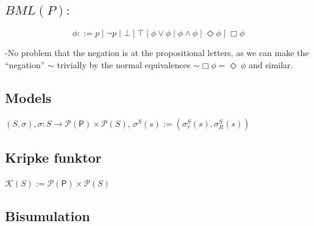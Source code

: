 \setcounter{secnumdepth}{-1} 

\newcommand{\num}[1]{\begin{align} #1 \end{align}}
\newcommand{\de}[1]{\stackrel{#1}{=}} 
\newcommand{\impl}[0]{\rightarrow}

\newcommand{\n}{\mathbb{N}}
\newcommand{\s}{\mathbb{S}} 
\newcommand{\bsa}{\underline{\leftrightarrow}}
\newcommand{\mea}{\leftrightsquigarrow}
\newcommand{\el}{\exists}
\newcommand{\ab}{\forall}
\newcommand{\pair}[1][x,y]{ (#1)}
\newcommand*\from{\colon}
\renewcommand{\P}{\mathcal{P}}
\newcommand{\K}{\mathcal{K}}
\newcommand{\PROP}{\mathsf{P}}
\newcommand{\Plift}{\overline \P}
\newcommand{\Klift}{\overline \K}

\newtheorem{conj}{Conjecture} 
\newtheorem{theorem}{Theorem}[conj] \newtheorem{lemma}[theorem]{Lemma}
\newtheorem{claim}[theorem]{Claim} \newtheorem{fact}[theorem]{Fact}
\newtheorem{corollary}[theorem]{Corollary}
 
\newtheorem{notation}[theorem]{Notation}





\subsection{$BML(P):$}
\label{sec:mlp}
\[\phi ::= p \mid \neg p \mid \bot \mid \top \mid \phi \lor \phi \mid \phi \land \phi \mid \Diamond\phi \mid \Box\phi\]

-No problem that the negation is at the propositional letters, as we can make
the ``negation'' $\sim$ trivially by the normal equivalences $\sim\Box\phi = \Diamond~\phi$ and
similar. 


\subsection{Models}
\label{sec:models}
$\pair[S,\sigma], \sigma \from S \to \P(\PROP)\times\P(S)$, $\sigma^{S}(s) := (\sigma_{v}^{S}(s),\sigma_{R}^{S}(s))$

\subsection{Kripke funktor}
\label{sec:kripke-funktor}
$\K(S) := \P(\PROP) \times \P(S)$

\subsection{Bisumulation}
\label{sec:bisumulation}

